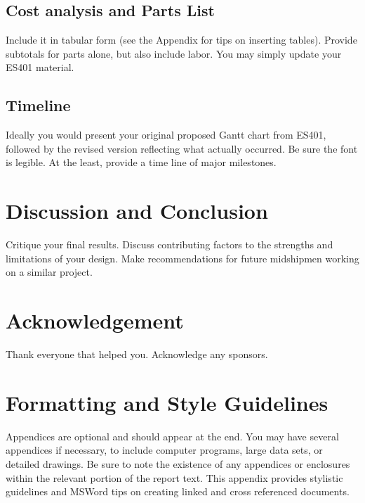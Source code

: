 \documentclass{wrcecapstone}
\newcommand{\myroot}{../}
\begin{document}
\subsection{Cost analysis and Parts List}
Include it in tabular form (see the Appendix for tips on inserting tables).  Provide subtotals for parts alone, but also include labor.  You may simply update your ES401 material.

\subsection{Timeline}
Ideally you would present your original proposed Gantt chart from ES401, followed by the revised version reflecting what actually occurred.   Be sure the font is legible.  At the least, provide a time line of major milestones.







\section{Discussion and Conclusion}
Critique your final results. Discuss contributing factors to the strengths and limitations of your design. 
Make recommendations for future midshipmen working on a similar project.




\section*{Acknowledgement}
Thank everyone that helped you. Acknowledge any sponsors. 

\nocite{*}





\clearpage
\appendix
\section{Formatting and Style Guidelines}
Appendices are optional and should appear at the end. You may have several appendices if necessary, to include computer programs, large data sets, or detailed drawings. Be sure to note the existence of any appendices or enclosures within the relevant portion of the report text.  
This appendix provides stylistic guidelines and MSWord tips on creating linked and cross referenced documents.  
\end{document}
